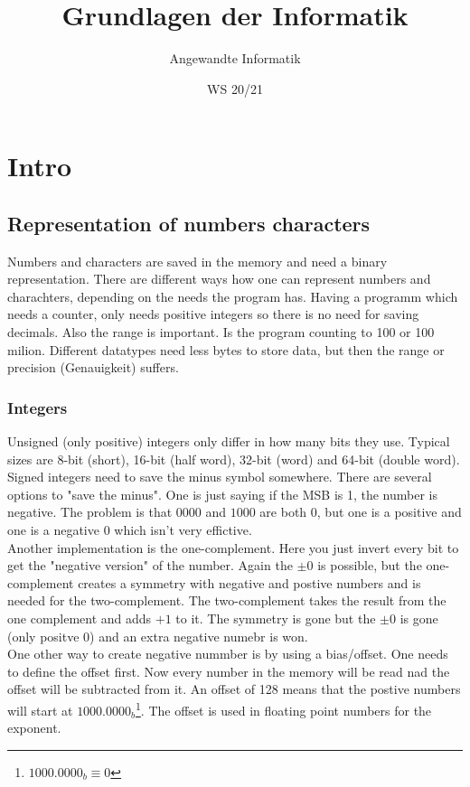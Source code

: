 \documentclass[a4paper]{scrartcl}
\author{Angewandte Informatik}
\title{Grundlagen der Informatik}
\date{WS 20/21}
\begin{document}
    \maketitle
    \newpage
    \tableofcontents
    \newpage
    \section{Intro}
        \subsection{Representation of numbers characters}
        Numbers and characters are saved in the memory and need a binary representation. There are different ways how one can represent numbers and charachters,
        depending on the needs the program has. Having a programm which needs a counter, only needs positive integers so there is no need for saving decimals.  Also the 
        range is important. Is the program counting to 100 or 100 milion. Different datatypes need less bytes to store data, but then the range or precision (Genauigkeit) suffers.
        
        \subsubsection*{Integers}
        Unsigned (only positive) integers only differ in how many bits they use. Typical sizes are  8-bit (short), 16-bit (half word), 32-bit (word) and 64-bit (double word). \\
        Signed integers need to save the minus symbol somewhere. There are several options to "save the minus". One is just saying if the MSB is 1, the number is negative. The problem
        is that \(0000\) and \(1000\) are both \(0\), but one is a positive and one is a negative \(0\) which isn't very effictive. \\
        Another implementation is the one-complement.
        Here you just invert every bit to get the "negative version" of the number. Again the \(\pm 0\) is possible, but the one-complement 
        creates a symmetry with negative and postive numbers and is needed for the two-complement. 
        The two-complement takes the result from the one complement and adds \(+1\) to it. The symmetry is gone but the \(\pm 0\) is gone (only positve 0) and an extra negative numebr is won. \\
        One other way to create negative nummber is by using a bias/offset. One needs to define the offset first. Now every number in the memory will be read nad the offset will be 
        subtracted from it. An offset of 128 means that the postive numbers will start at \(1000.0000_b \)\footnote{\(1000.0000_b \equiv 0\)}. The offset is used in floating point numbers for the exponent.
\end{document}
